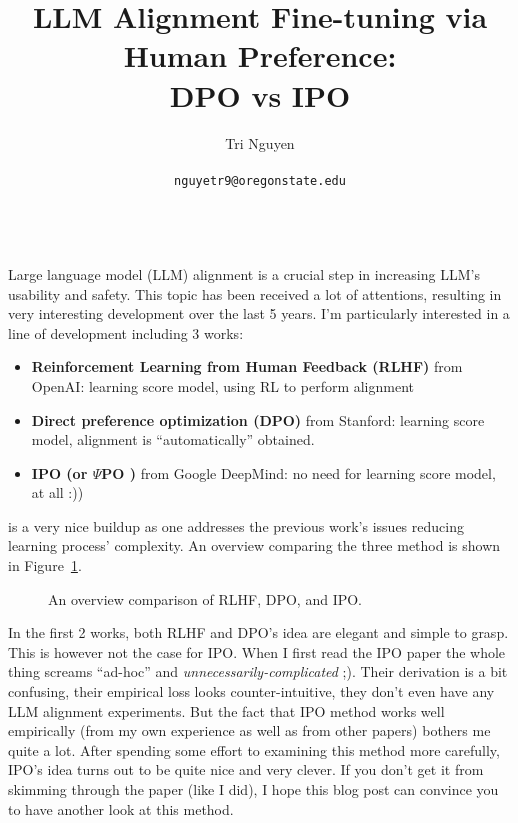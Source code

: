 \documentclass[11pt,a4paper]{article}
\title{LLM Alignment Fine-tuning via Human Preference: \\
DPO vs IPO}
\author{	Tri Nguyen \\\\
        \texttt{nguyetr9@oregonstate.edu} \\\\
        }
\begin{document}
\maketitle
Large language model (LLM) alignment is a crucial step in increasing LLM's usability and safety.
This topic has been received a lot of attentions, resulting in very interesting development over the last 5 years. 
I'm particularly interested in a line of development including 3 works: 
\begin{itemize}
    \item \textbf{Reinforcement Learning from Human Feedback (RLHF)} \cite{ouyang2022training,christiano2017deep,bai2022constitutional,stiennon2020learning} from OpenAI: learning score model, using RL to perform alignment
    \item \textbf{Direct preference optimization (DPO)} \cite{rafailov2023direct} from Stanford: learning score model, alignment is ``automatically'' obtained.
    \item \textbf{IPO (or $\Psi$PO )} \cite{azar2023general} from Google DeepMind: no need for learning score model, at all :))
\end{itemize}
is a very nice buildup as one addresses the previous work's issues reducing learning process' complexity. An overview comparing the three method is shown in Figure~\ref{fig:overview}.

\begin{figure}[ht]
    \centering
    \resizebox{\linewidth}{!}{
        
    }
    \caption{An overview comparison of RLHF, DPO, and IPO.}
    \label{fig:overview}
\end{figure}

In the first 2 works, both RLHF and DPO's idea are elegant and simple to grasp. This is however not the case for IPO. When I first read the IPO paper the whole thing screams ``ad-hoc'' and \textit{unnecessarily-complicated} ;). Their derivation is a bit confusing, their empirical loss looks counter-intuitive, they  don't even have any LLM alignment experiments.
But the fact that IPO method works well empirically (from my own experience as well as from other papers) bothers me quite a lot.
After spending some effort to examining this method more carefully, IPO's idea turns out to be quite nice and very clever. If you don't get it from skimming through the paper (like I did), I hope this blog post can convince you to have another look at this method.
\end{document}
